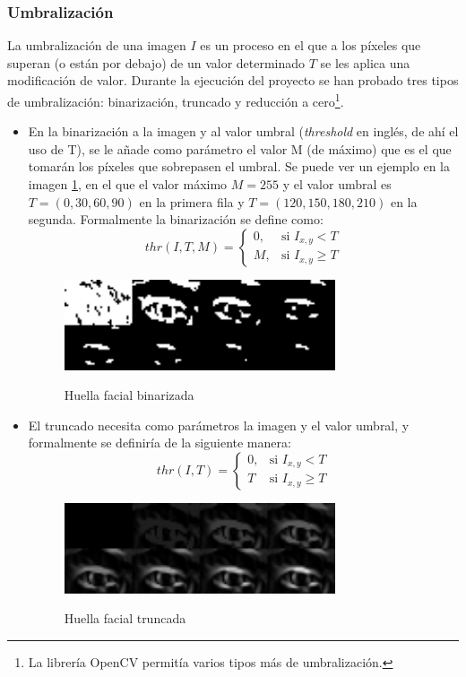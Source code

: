 \subsubsection{Umbralización}
La umbralización de una imagen $I$ es un proceso en el que a los píxeles que superan (o están por debajo) de un valor determinado $T$ se les aplica una modificación de valor. Durante la ejecución del proyecto se han probado tres tipos de umbralización: binarización, truncado y reducción a cero\footnote{La librería OpenCV permitía varios tipos más de umbralización.}.
\begin{itemize}
	\item{En la binarización a la imagen y al valor umbral (\textit{threshold} en inglés, de ahí el uso de T), se le añade como parámetro el valor M (de máximo) que es el que tomarán los píxeles que sobrepasen el umbral. Se puede ver un ejemplo en la imagen \ref{fig:thr_binarization}, en el que el valor máximo $M=255$ y el valor umbral es $T=(0,30,60,90)$ en la primera fila y $T=(120,150,180,210)$ en la segunda. Formalmente la binarización se define como:}
	\[
		thr(I,T,M) = \begin{cases}
				0, & \text{si $I_{x,y} < T$}\\
				M, & \text{si $I_{x,y} \geq T$}
			\end{cases}
	\]

	\begin{figure}[h!]
		\centering
		\includegraphics[width=8cm]{imagenes/umbral_binarizada.png}\\
		\caption{Huella facial binarizada}
		\label{fig:thr_binarization}
	\end{figure}

	\item{El truncado necesita como parámetros la imagen y el valor umbral, y formalmente se definiría de la siguiente manera:}
	\[
		thr(I,T) = \begin{cases}
				0, & \text{si $I_{x,y} < T$}\\
				T & \text{si $I_{x,y} \geq T$}
			\end{cases}
	\]
	\begin{figure}[h!]
		\centering
		\includegraphics[width=8cm]{imagenes/umbral_truncada.png}\\
		\caption{Huella facial truncada}
		\label{fig:thr_truncate}
	\end{figure}


\end{itemize}
